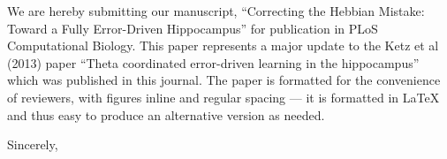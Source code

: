 \documentclass[11pt]{letter}
\begin{document}
\begin{letter}
{\vspace*{-.25in}}

\opening{\vspace*{.25in}}

We are hereby submitting our manuscript, ``Correcting the Hebbian Mistake: Toward a Fully Error-Driven Hippocampus'' for publication in PLoS Computational Biology.  This paper represents a major update to the Ketz et al (2013) paper ``Theta coordinated error-driven learning in the hippocampus'' which was published in this journal.  The paper is formatted for the convenience of reviewers, with figures inline and regular spacing --- it is formatted in LaTeX and thus easy to produce an alternative version as needed.

\closing{Sincerely,}


\end{letter}
\end{document}
